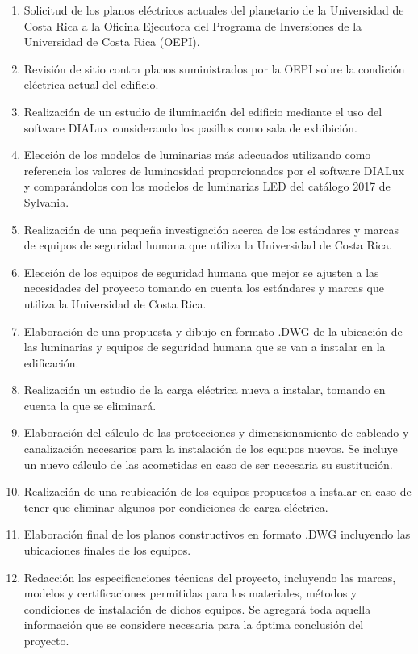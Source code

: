 \begin{enumerate}
	\item Solicitud de los planos eléctricos actuales del planetario de la Universidad de Costa Rica a la Oficina Ejecutora del Programa de Inversiones de la Universidad de Costa Rica (OEPI).
	\item Revisión de sitio contra planos suministrados por la OEPI sobre la condición eléctrica actual del edificio.
	\item Realización de un estudio de iluminación del edificio mediante el uso del software DIALux considerando los pasillos como sala de exhibición.
	\item Elección de los modelos de luminarias más adecuados utilizando como referencia los valores de luminosidad proporcionados por el software DIALux y comparándolos con los modelos de luminarias LED del catálogo 2017 de Sylvania.
	\item Realización de una pequeña investigación acerca de los estándares y marcas de equipos de seguridad humana que utiliza la Universidad de Costa Rica.
	\item Elección de los equipos de seguridad humana que mejor se ajusten a las necesidades del proyecto tomando en cuenta los estándares y marcas que utiliza la Universidad de Costa Rica.
	\item Elaboración de una propuesta y dibujo en formato .DWG de la ubicación de las luminarias y equipos de seguridad humana que se van a instalar en la edificación.
	\item Realización un estudio de la carga eléctrica nueva a instalar, tomando en cuenta la que se eliminará.
	\item Elaboración del cálculo de las protecciones y dimensionamiento de cableado y canalización necesarios para la instalación de los equipos nuevos. Se incluye un nuevo cálculo de las acometidas en caso de ser necesaria su sustitución.
	\item Realización de una reubicación de los equipos propuestos a instalar en caso de tener que eliminar algunos por condiciones de carga eléctrica.
	\item Elaboración final de los planos constructivos en formato .DWG incluyendo las ubicaciones finales de los equipos.
	\item Redacción las especificaciones técnicas del proyecto, incluyendo las marcas, modelos y certificaciones permitidas para los materiales, métodos y condiciones de instalación de dichos equipos. Se agregará toda aquella información que se considere necesaria para la óptima conclusión del proyecto.
\end{enumerate}


